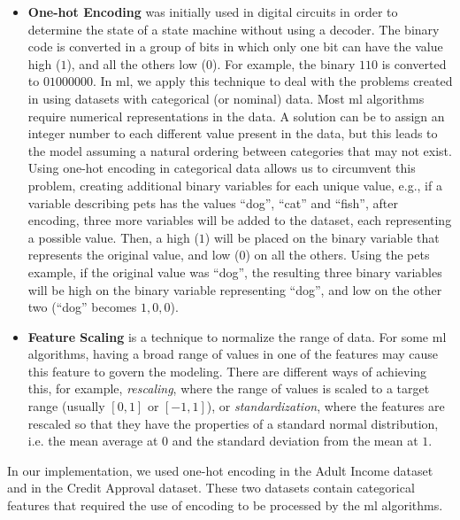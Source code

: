 \begin{itemize}
    

	\item\textbf{One-hot Encoding}\cite{harris2010digital} was initially used in digital circuits in order to determine the state of a state machine without using a decoder. The binary code is converted in a group of bits in which only one bit can have the value high ($1$), and all the others low ($0$). For example, the binary $110$ is converted to $01000000$.
	In \ac{ml}, we apply this technique to deal with the problems created in using datasets with categorical (or nominal) data. Most \ac{ml} algorithms require numerical representations in the data. A solution can be to assign an integer number to each different value present in the data, but this leads to the model assuming a natural ordering between categories that may not exist.
	Using one-hot encoding in categorical data allows us to circumvent this problem, creating additional binary variables for each unique value, e.g., if a variable describing pets has the values ``dog'', ``cat'' and ``fish'', after encoding, three more variables will be added to the dataset, each representing a possible value. Then, a high ($1$) will be placed on the binary variable that represents the original value, and low ($0$) on all the others. Using the pets example, if the original value was ``dog'', the resulting three binary variables will be high on the binary variable representing ``dog'', and low on the other two (``dog'' becomes $1,0,0$).

	\item\textbf{Feature Scaling} is a technique to normalize the range of data. For some \ac{ml} algorithms, having a broad range of values in one of the features may cause this feature to govern the modeling. There are different ways of achieving this, for example, \textit{rescaling}, where the range of values is scaled to a target range (usually $[0,1]$ or $[-1,1]$), or \textit{standardization}, where the features are rescaled so that they have the properties of a standard normal distribution, i.e. the mean average at $0$ and the standard deviation from the mean at $1$.



\end{itemize}

In our implementation, we used one-hot encoding in the Adult Income dataset and in the Credit Approval dataset. These two datasets contain categorical features that required the use of encoding to be processed by the \ac{ml} algorithms.

